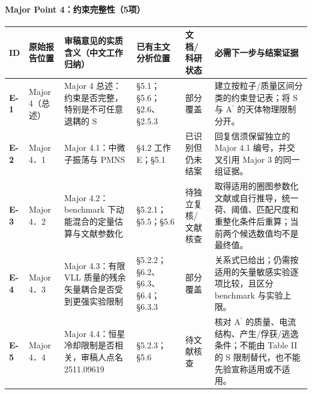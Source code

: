 \documentclass[
  chinese,
  UTF8]{ctexart}
\newcounter{none} %
\begin{document}
\paragraph{Major Point
4：约束完整性（5项）}\label{major-point-4ux7ea6ux675fux5b8cux6574ux60275ux9879}

{\def\LTcaptype{none} %
\begin{longtable}[]{@{}
  >{\raggedright\arraybackslash}p{}
  >{\raggedright\arraybackslash}p{}
  >{\raggedright\arraybackslash}p{}
  >{\raggedright\arraybackslash}p{}
  >{\raggedright\arraybackslash}p{}
  >{\raggedright\arraybackslash}p{}@{}}
\toprule\noalign{}
\begin{minipage}[b]{\linewidth}\raggedright
ID
\end{minipage} & \begin{minipage}[b]{\linewidth}\raggedright
原始报告位置
\end{minipage} & \begin{minipage}[b]{\linewidth}\raggedright
审稿意见的实质含义（中文工作归纳）
\end{minipage} & \begin{minipage}[b]{\linewidth}\raggedright
已有主文分析位置
\end{minipage} & \begin{minipage}[b]{\linewidth}\raggedright
文档/科研状态
\end{minipage} & \begin{minipage}[b]{\linewidth}\raggedright
必需下一步与结案证据
\end{minipage} \\
\midrule\noalign{}
\endhead
\bottomrule\noalign{}
\endlastfoot
\textbf{E-1} & Major 4（总述） & Major 4
总述：约束是否完整，特别是不可任意退耦的 S & §5.1；§5.6；§2.6、§2.5.3 &
部分覆盖 & 建立按粒子/质量区间分类的约束登记表；将 S 与
A\ensuremath{^\prime} 的天体物理限制分开。 \\
\textbf{E-2} & Major 4．1 & Major 4.1：中微子振荡与 PMNS & §4.2 工作
E；§5.1 & 已识别但仍未结案 & 回复信须保留独立的 Major 4.1
编号，并交叉引用 Major 3 的同一组证据。 \\
\textbf{E-3} & Major 4．2 & Major 4.2：benchmark
下动能混合的定量估算与文献参数化 & §5.2.1；§5.5；§5.6 &
待独立复核/文献核查 &
取得适用的圈图参数化文献或自行推导，统一荷、阈值、匹配尺度和重整化条件后重算；当前两个候选数值均不是最终值。 \\
\textbf{E-4} & Major 4．3 & Major 4.3：有限 VLL
质量的残余矢量耦合是否受到更强实验限制 &
§5.2.2；§6.2、§6.3、§6.4；§6.3.3 & 部分覆盖 &
关系式已给出；仍需按适用的矢量敏感实验逐项比较，且区分 benchmark
与实验上限。 \\
\textbf{E-5} & Major 4．4 & Major 4.4：恒星冷却限制是否相关，审稿人点名
2511.09619 & §5.2.3；§5.6 & 待文献核查 & 核对 A\ensuremath{^\prime}
的质量、电流结构、产生/俘获/逃逸条件；不能由 Table II 的 S
限制替代，也不能先验宣称适用或不适用。 \\
\end{longtable}
}
\end{document}
